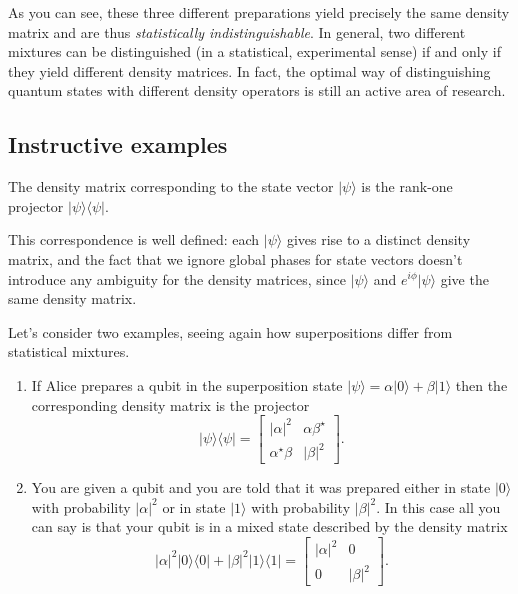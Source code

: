 \documentclass[fleqn,a4paper]{article}
\newenvironment{idea}{\everypar{\setlength{\parindent}{1.5em}}}{}
\theoremstyle{definition}
\theoremstyle{definition}
\theoremstyle{definition}
\theoremstyle{definition}
\theoremstyle{remark}
\begin{document}
As you can see, these three different preparations yield precisely the same density matrix and are thus \emph{statistically indistinguishable}.
In general, two different mixtures can be distinguished (in a statistical, experimental sense) if and only if they yield different density matrices.
In fact, the optimal way of distinguishing quantum states with different density operators is still an active area of research.

\hypertarget{instructive-examples}{%
\subsection{Instructive examples}\label{instructive-examples}}

\begin{idea}
The density matrix corresponding to the state vector \(|\psi\rangle\) is the rank-one projector \(|\psi\rangle\langle\psi|\).

\end{idea}

This correspondence is well defined: each \(|\psi\rangle\) gives rise to a distinct density matrix, and the fact that we ignore global phases for state vectors doesn't introduce any ambiguity for the density matrices, since \(|\psi\rangle\) and \(e^{i\phi}|\psi\rangle\) give the same density matrix.

Let's consider two examples, seeing again how superpositions differ from statistical mixtures.

\begin{enumerate}
\def\labelenumi{\arabic{enumi}.}
\item
  If Alice prepares a qubit in the superposition state \(|\psi\rangle = \alpha|0\rangle + \beta|1\rangle\) then the corresponding density matrix is the projector
  \[
     |\psi\rangle\langle\psi|
     = \begin{bmatrix}
       |\alpha|^2 & \alpha\beta^\star
     \\\alpha^\star\beta & |\beta|^2
     \end{bmatrix}.
   \]
\item
  You are given a qubit and you are told that it was prepared either in state \(|0\rangle\) with probability \(|\alpha|^2\) or in state \(|1\rangle\) with probability \(|\beta|^2\).
  In this case all you can say is that your qubit is in a mixed state described by the density matrix
  \[
     |\alpha|^2|0\rangle\langle 0| + |\beta|^2|1\rangle\langle 1|
     = \begin{bmatrix}
       |\alpha|^2 & 0
     \\0 & |\beta|^2
     \end{bmatrix}.
   \]
\end{enumerate}
\end{document}
